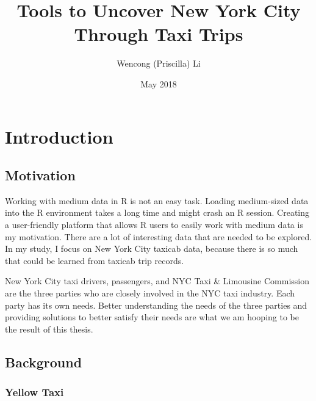 \documentclass[12pt,twoside]{reedthesis}
\title{Tools to Uncover New York City Through Taxi Trips}
\author{Wencong (Priscilla) Li}
\date{May 2018}
\theoremstyle{definition}
\theoremstyle{definition}
\theoremstyle{definition}
\theoremstyle{remark}
\begin{document}
  \maketitle

\frontmatter %
\pagestyle{empty} %



  \hypersetup{linkcolor=black}
  \setcounter{tocdepth}{2}
  \tableofcontents

  \listoftables

  \listoffigures



\mainmatter %
\pagestyle{fancyplain} %

\chapter{Introduction}\label{introduction}

\section{Motivation}\label{motivation}

Working with medium data in R is not an easy task. Loading medium-sized
data into the R environment takes a long time and might crash an R
session. Creating a user-friendly platform that allows R users to easily
work with medium data is my motivation. There are a lot of interesting
data that are needed to be explored. In my study, I focus on New York
City taxicab data, because there is so much that could be learned from
taxicab trip records.

New York City taxi drivers, passengers, and NYC Taxi \& Limousine
Commission are the three parties who are closely involved in the NYC
taxi industry. Each party has its own needs. Better understanding the
needs of the three parties and providing solutions to better satisfy
their needs are what we am hooping to be the result of this thesis.

\section{Background}\label{background}

\subsection{Yellow Taxi}\label{yellow-taxi}
\end{document}
